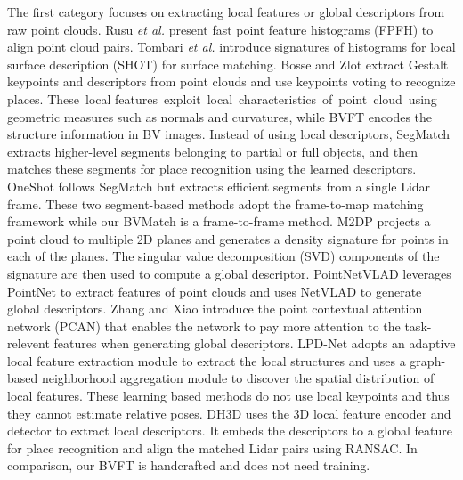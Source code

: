 \documentclass[letterpaper, 10 pt, journal, twoside]{IEEEtran}
\begin{document}
The first category focuses on extracting local features or global descriptors from raw point clouds. Rusu \emph{et al.} \cite{rusu2009fast} present fast point feature histograms (FPFH) to align point cloud pairs. Tombari \emph{et al.} \cite{tombari2010unique} introduce signatures of histograms for local surface description (SHOT) for surface matching. Bosse and Zlot \cite{bosse2013place} extract Gestalt keypoints and descriptors from point clouds and use keypoints voting to recognize places. {These local features exploit local characteristics of point cloud using geometric measures such as normals and curvatures, while BVFT encodes the structure information in BV images.} Instead of using local descriptors, SegMatch \cite{2018segmap} extracts higher-level segments belonging to partial or full objects, and then matches these segments for place recognition using the learned descriptors. OneShot \cite{ratz2020oneshot} follows SegMatch but extracts efficient segments from a single Lidar frame. {These two segment-based methods adopt the frame-to-map matching framework while our BVMatch is a frame-to-frame method.} M2DP \cite{he2016m2dp} projects a point cloud to multiple 2D planes and generates a density signature for points in each of the planes. The singular value decomposition (SVD) components of the signature are then used to compute a global descriptor. PointNetVLAD \cite{angelina2018pointnetvlad} leverages PointNet \cite{qi2017pointnet} to extract features of point clouds and uses NetVLAD \cite{arandjelovic2016netvlad} to generate global descriptors. {Zhang and Xiao \cite{zhang2019pcan} introduce the point contextual attention network (PCAN) that enables the network to pay more attention to the task-relevent features when generating global descriptors.} LPD-Net \cite{liu2019lpd} adopts an adaptive local feature extraction module to extract the local structures and uses a graph-based neighborhood aggregation module to discover the spatial distribution of local features. {These learning based methods do not use local keypoints and thus they cannot estimate relative poses. DH3D \cite{du2020dh3d} uses the 3D local feature encoder and detector to extract local descriptors. It embeds the descriptors to a global feature for place recognition and align the matched Lidar pairs using RANSAC. In comparison, our BVFT is handcrafted and does not need training.}
\end{document}
